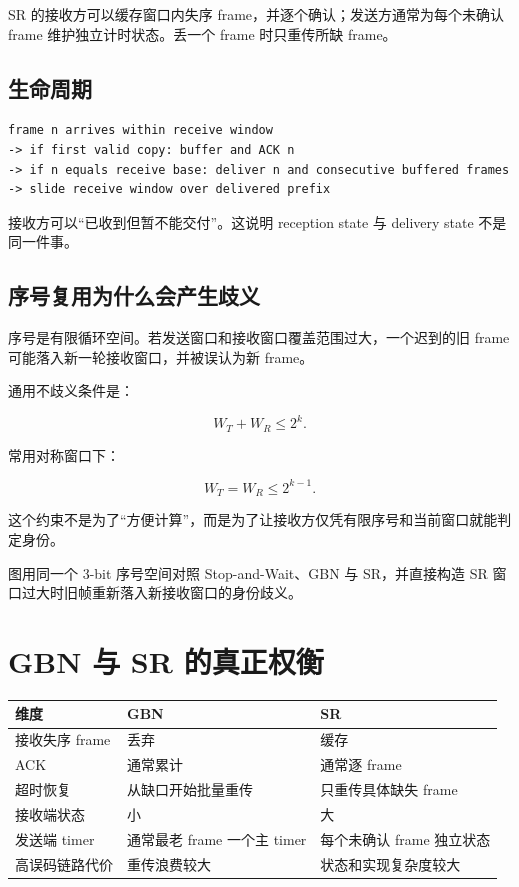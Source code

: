 \documentclass[UTF8,fontset=none,11pt,a4paper]{ctexart}
\begin{document}
SR 的接收方可以缓存窗口内失序 frame，并逐个确认；发送方通常为每个未确认
frame 维护独立计时状态。丢一个 frame 时只重传所缺 frame。

\subsection{生命周期}\label{61-ux751fux547dux5468ux671f}

\begin{lstlisting}
frame n arrives within receive window
-> if first valid copy: buffer and ACK n
-> if n equals receive base: deliver n and consecutive buffered frames
-> slide receive window over delivered prefix
\end{lstlisting}

接收方可以``已收到但暂不能交付''。这说明 reception state 与 delivery
state 不是同一件事。

\subsection{序号复用为什么会产生歧义}\label{62-ux5e8fux53f7ux590dux7528ux4e3aux4ec0ux4e48ux4f1aux4ea7ux751fux6b67ux4e49}

序号是有限循环空间。若发送窗口和接收窗口覆盖范围过大，一个迟到的旧 frame
可能落入新一轮接收窗口，并被误认为新 frame。

通用不歧义条件是：

\[
W_T+W_R\le 2^k.
\]

常用对称窗口下：

\[
W_T=W_R\le 2^{k-1}.
\]

这个约束不是为了``方便计算''，而是为了让接收方仅凭有限序号和当前窗口就能判定身份。

\begin{center}
\resizebox{0.96\linewidth}{!}{}
\end{center}
图用同一个 3-bit 序号空间对照 Stop-and-Wait、GBN 与 SR，并直接构造 SR 窗口过大时旧帧重新落入新接收窗口的身份歧义。

\section{GBN 与 SR
的真正权衡}\label{7-gbn-ux4e0e-sr-ux7684ux771fux6b63ux6743ux8861}

\begin{longtable}[]{@{}lll@{}}
\toprule\noalign{}
维度 & GBN & SR \\
\midrule\noalign{}
\endhead
\bottomrule\noalign{}
\endlastfoot
接收失序 frame & 丢弃 & 缓存 \\
ACK & 通常累计 & 通常逐 frame \\
超时恢复 & 从缺口开始批量重传 & 只重传具体缺失 frame \\
接收端状态 & 小 & 大 \\
发送端 timer & 通常最老 frame 一个主 timer & 每个未确认 frame
独立状态 \\
高误码链路代价 & 重传浪费较大 & 状态和实现复杂度较大 \\
\end{longtable}
\end{document}

